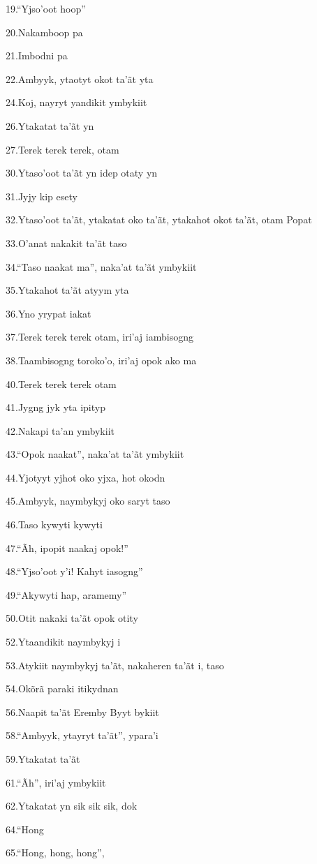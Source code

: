 19.``Yjso'oot hoop''

20.Nakamboop pa

21.Imbodni pa

22.Ambyyk, ytaotyt okot ta'ãt yta

24.Koj, nayryt yandikit ymbykiit

26.Ytakatat ta'ãt yn

27.Terek terek terek, otam

30.Ytaso'oot ta'ãt yn idep otaty yn

31.Jyjy kip esety

32.Ytaso'oot ta'ãt, ytakatat oko ta'ãt, ytakahot okot ta'ãt, otam Popat

33.O'anat nakakit ta'ãt taso

34.``Taso naakat ma'', naka'at ta'ãt ymbykiit

35.Ytakahot ta'ãt atyym yta

36.Yno yrypat iakat

37.Terek terek terek otam, iri'aj iambisogng

38.Taambisogng toroko'o, iri'aj opok ako ma

40.Terek terek terek otam

41.Jygng jyk yta ipityp

42.Nakapi ta'an ymbykiit

43.``Opok naakat'', naka'at ta'ãt ymbykiit

44.Yjotyyt yjhot oko yjxa, hot okodn

45.Ambyyk, naymbykyj oko saryt taso

46.Taso kywyti kywyti

47.``Ãh, ipopit naakaj opok!''

48.``Yjso'oot y'i! Kahyt iasogng''

49.``Akywyti hap, aramemy''

50.Otit nakaki ta'ãt opok otity

52.Ytaandikit naymbykyj i

53.Atykiit naymbykyj ta'ãt, nakaheren ta'ãt i, taso

54.Okõrã paraki itikydnan

56.Naapit ta'ãt Eremby Byyt bykiit

58.``Ambyyk, ytayryt ta'ãt'', ypara'i

59.Ytakatat ta'ãt

61.``Ãh'', iri'aj ymbykiit

62.Ytakatat yn sik sik sik, dok

64.``Hong

65.``Hong, hong, hong'',

